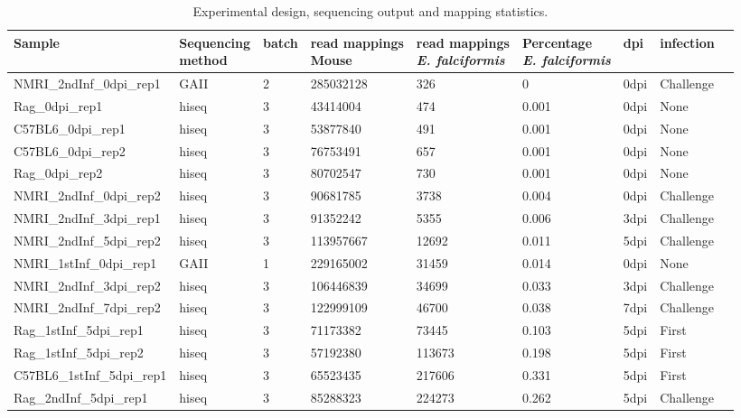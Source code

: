\documentclass{bmcart}
\begin{document}
\begin{backmatter}

\begin{table}[ht]
\caption{Experimental design, sequencing output and mapping statistics.}
\centering
\hspace*{-1.5cm}\begin{tabular}{lllllllll}
  \hline
Sample & \bcell{Sequencing\\method} & batch & \bcell{read mappings\\Mouse} & \bcell{read mappings\\\textit{E. falciformis}} & \bcell{Percentage\\\textit{E. falciformis}} & dpi & infection  \\ 
\hline
  NMRI\_2ndInf\_0dpi\_rep1 & GAII & 2 & 285032128 & 326 & 0 & 0dpi & Challenge \\ 
  Rag\_0dpi\_rep1 & hiseq & 3 & 43414004 & 474 & 0.001 & 0dpi & None \\ 
  C57BL6\_0dpi\_rep1 & hiseq & 3 & 53877840 & 491 & 0.001 & 0dpi & None \\ 
  C57BL6\_0dpi\_rep2 & hiseq & 3 & 76753491 & 657 & 0.001 & 0dpi & None \\ 
  Rag\_0dpi\_rep2 & hiseq & 3 & 80702547 & 730 & 0.001 & 0dpi & None \\ 
  NMRI\_2ndInf\_0dpi\_rep2 & hiseq & 3 & 90681785 & 3738 & 0.004 & 0dpi & Challenge \\ 
  \rowcolor{LightCyan}
  NMRI\_2ndInf\_3dpi\_rep1 & hiseq & 3 & 91352242 & 5355 & 0.006 & 3dpi & Challenge \\ 
  \rowcolor{LightCyan}
  NMRI\_2ndInf\_5dpi\_rep2 & hiseq & 3 & 113957667 & 12692 & 0.011 & 5dpi & Challenge \\ 
  \rowcolor{LightRed}
  NMRI\_1stInf\_0dpi\_rep1 & GAII & 1 & 229165002 & 31459 & 0.014 & 0dpi & None \\ 
  NMRI\_2ndInf\_3dpi\_rep2 & hiseq & 3 & 106446839 & 34699 & 0.033 & 3dpi & Challenge \\ 
  NMRI\_2ndInf\_7dpi\_rep2 & hiseq & 3 & 122999109 & 46700 & 0.038 & 7dpi & Challenge \\ 
  Rag\_1stInf\_5dpi\_rep1 & hiseq & 3 & 71173382 & 73445 & 0.103 & 5dpi & First \\ 
  Rag\_1stInf\_5dpi\_rep2 & hiseq & 3 & 57192380 & 113673 & 0.198 & 5dpi & First \\ 
  C57BL6\_1stInf\_5dpi\_rep1 & hiseq & 3 & 65523435 & 217606 & 0.331 & 5dpi & First \\ 
  Rag\_2ndInf\_5dpi\_rep1 & hiseq & 3 & 85288323 & 224273 & 0.262 & 5dpi & Challenge \\ 

\end{tabular}
\end{table}
\end{backmatter}
\end{document}
